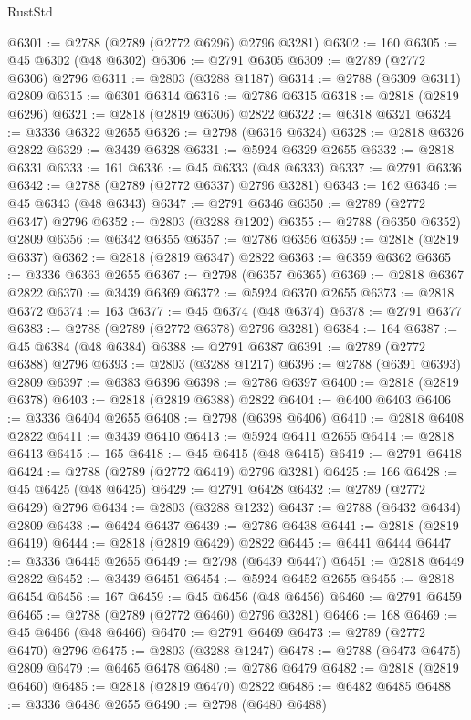 \begin{lexlean}{RustStd}
\begin{coremodule}
@6301 := @2788 (@2789 (@2772 @6296) @2796 @3281)
@6302 := 160
@6305 := @45 @6302 (@48 @6302)
@6306 := @2791 @6305
@6309 := @2789 (@2772 @6306) @2796
@6311 := @2803 (@3288 @1187)
@6314 := @2788 (@6309 @6311) @2809
@6315 := @6301 @6314
@6316 := @2786 @6315
@6318 := @2818 (@2819 @6296)
@6321 := @2818 (@2819 @6306) @2822
@6322 := @6318 @6321
@6324 := @3336 @6322 @2655
@6326 := @2798 (@6316 @6324)
@6328 := @2818 @6326 @2822
@6329 := @3439 @6328
@6331 := @5924 @6329 @2655
@6332 := @2818 @6331
@6333 := 161
@6336 := @45 @6333 (@48 @6333)
@6337 := @2791 @6336
@6342 := @2788 (@2789 (@2772 @6337) @2796 @3281)
@6343 := 162
@6346 := @45 @6343 (@48 @6343)
@6347 := @2791 @6346
@6350 := @2789 (@2772 @6347) @2796
@6352 := @2803 (@3288 @1202)
@6355 := @2788 (@6350 @6352) @2809
@6356 := @6342 @6355
@6357 := @2786 @6356
@6359 := @2818 (@2819 @6337)
@6362 := @2818 (@2819 @6347) @2822
@6363 := @6359 @6362
@6365 := @3336 @6363 @2655
@6367 := @2798 (@6357 @6365)
@6369 := @2818 @6367 @2822
@6370 := @3439 @6369
@6372 := @5924 @6370 @2655
@6373 := @2818 @6372
@6374 := 163
@6377 := @45 @6374 (@48 @6374)
@6378 := @2791 @6377
@6383 := @2788 (@2789 (@2772 @6378) @2796 @3281)
@6384 := 164
@6387 := @45 @6384 (@48 @6384)
@6388 := @2791 @6387
@6391 := @2789 (@2772 @6388) @2796
@6393 := @2803 (@3288 @1217)
@6396 := @2788 (@6391 @6393) @2809
@6397 := @6383 @6396
@6398 := @2786 @6397
@6400 := @2818 (@2819 @6378)
@6403 := @2818 (@2819 @6388) @2822
@6404 := @6400 @6403
@6406 := @3336 @6404 @2655
@6408 := @2798 (@6398 @6406)
@6410 := @2818 @6408 @2822
@6411 := @3439 @6410
@6413 := @5924 @6411 @2655
@6414 := @2818 @6413
@6415 := 165
@6418 := @45 @6415 (@48 @6415)
@6419 := @2791 @6418
@6424 := @2788 (@2789 (@2772 @6419) @2796 @3281)
@6425 := 166
@6428 := @45 @6425 (@48 @6425)
@6429 := @2791 @6428
@6432 := @2789 (@2772 @6429) @2796
@6434 := @2803 (@3288 @1232)
@6437 := @2788 (@6432 @6434) @2809
@6438 := @6424 @6437
@6439 := @2786 @6438
@6441 := @2818 (@2819 @6419)
@6444 := @2818 (@2819 @6429) @2822
@6445 := @6441 @6444
@6447 := @3336 @6445 @2655
@6449 := @2798 (@6439 @6447)
@6451 := @2818 @6449 @2822
@6452 := @3439 @6451
@6454 := @5924 @6452 @2655
@6455 := @2818 @6454
@6456 := 167
@6459 := @45 @6456 (@48 @6456)
@6460 := @2791 @6459
@6465 := @2788 (@2789 (@2772 @6460) @2796 @3281)
@6466 := 168
@6469 := @45 @6466 (@48 @6466)
@6470 := @2791 @6469
@6473 := @2789 (@2772 @6470) @2796
@6475 := @2803 (@3288 @1247)
@6478 := @2788 (@6473 @6475) @2809
@6479 := @6465 @6478
@6480 := @2786 @6479
@6482 := @2818 (@2819 @6460)
@6485 := @2818 (@2819 @6470) @2822
@6486 := @6482 @6485
@6488 := @3336 @6486 @2655
@6490 := @2798 (@6480 @6488)

\end{coremodule}
\end{lexlean}
